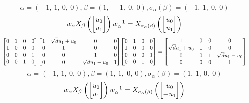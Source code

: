 \documentclass[11pt]{article}
\theoremstyle{definition}
\begin{document}
\[
\alpha = \left( -1, \  1, \  0, \  0\right), \beta = \left( 1, \  -1, \  0, \  0\right), \sigma_{\alpha}(\beta) = \left( -1, \  1, \  0, \  0\right)
\]
\[
\scaletoalign{\textwidth}{w_{\alpha} X_{\beta}\left(\left[\begin{matrix}u_{0}\\u_{1}\end{matrix}\right]\right) w_{\alpha}^{-1} = X_{\sigma_{\alpha}\left(\beta\right)}\left(\left[\begin{matrix}u_{0}\\u_{1}\end{matrix}\right]\right)}
\]
\[
\scaletoalign{\textwidth}{{\left[\begin{matrix}0 & 1 & 0 & 0\\1 & 0 & 0 & 0\\0 & 0 & 0 & 1\\0 & 0 & 1 & 0\end{matrix}\right]} {\left[\begin{matrix}1 & \sqrt{d} u_{1} + u_{0} & 0 & 0\\0 & 1 & 0 & 0\\0 & 0 & 1 & 0\\0 & 0 & \sqrt{d} u_{1} - u_{0} & 1\end{matrix}\right]} {\left[\begin{matrix}0 & 1 & 0 & 0\\1 & 0 & 0 & 0\\0 & 0 & 0 & 1\\0 & 0 & 1 & 0\end{matrix}\right]} = {\left[\begin{matrix}1 & 0 & 0 & 0\\\sqrt{d} u_{1} + u_{0} & 1 & 0 & 0\\0 & 0 & 1 & \sqrt{d} u_{1} - u_{0}\\0 & 0 & 0 & 1\end{matrix}\right]}}
\]
\[
\alpha = \left( -1, \  1, \  0, \  0\right), \beta = \left( 1, \  1, \  0, \  0\right), \sigma_{\alpha}(\beta) = \left( 1, \  1, \  0, \  0\right)
\]
\[
\scaletoalign{\textwidth}{w_{\alpha} X_{\beta}\left(\left[\begin{matrix}u_{0}\\u_{1}\end{matrix}\right]\right) w_{\alpha}^{-1} = X_{\sigma_{\alpha}\left(\beta\right)}\left(\left[\begin{matrix}u_{0}\\- u_{1}\end{matrix}\right]\right)}
\]
\end{document}
